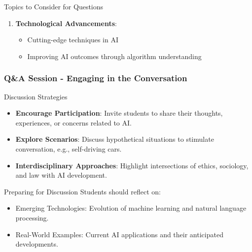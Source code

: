 \documentclass[aspectratio=169]{beamer}
\begin{document}
\begin{frame}[fragile]
\begin{block}{Topics to Consider for Questions}
\begin{enumerate}
            \item \textbf{Technological Advancements}:
                \begin{itemize}
                    \item Cutting-edge techniques in AI
                    \item Improving AI outcomes through algorithm understanding
                \end{itemize}
        \end{enumerate}
    \end{block}
\end{frame}

\begin{frame}[fragile]
    \frametitle{Q\&A Session - Engaging in the Conversation}
    \begin{block}{Discussion Strategies}
        \begin{itemize}
            \item \textbf{Encourage Participation}: Invite students to share their thoughts, experiences, or concerns related to AI.
            \item \textbf{Explore Scenarios}: Discuss hypothetical situations to stimulate conversation, e.g., self-driving cars.
            \item \textbf{Interdisciplinary Approaches}: Highlight intersections of ethics, sociology, and law with AI development.
        \end{itemize}
    \end{block}
    
    \begin{block}{Preparing for Discussion}
        Students should reflect on:
        \begin{itemize}
            \item Emerging Technologies: Evolution of machine learning and natural language processing.
            \item Real-World Examples: Current AI applications and their anticipated developments.
        \end{itemize}
    \end{block}
\end{frame}
\end{document}

